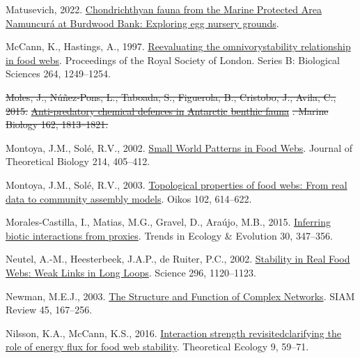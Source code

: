 \documentclass[
]{article}
\newlength{\cslhangindent}
\newenvironment{CSLReferences}[2] %
 {\begin{list}{}{%
  \setlength{\itemindent}{0pt}
  \setlength{\leftmargin}{0pt}
  \setlength{\parsep}{0pt}
  \ifodd #1
   \setlength{\leftmargin}{\cslhangindent}
   \setlength{\itemindent}{-1\cslhangindent}
  \fi
  \setlength{\itemsep}{#2\baselineskip}}}
 {\end{list}}
\providecommand{\DIFdel}[1]{{\protect\color{red}\sout{#1}}}                      %
\providecommand{\DIFdelbegin}{} %
\providecommand{\DIFdelend}{} %
\newcommand{\DIFscaledelfig}{0.5}
\newlength{\DIFdelgraphicswidth} %
\newlength{\DIFdelgraphicsheight} %
\newcommand{\DIFdelincludegraphics}[2][]{%
\sbox{\DIFdelgraphicsbox}{\DIFOincludegraphics[#1]{#2}}%
\settoboxwidth{\DIFdelgraphicswidth}{\DIFdelgraphicsbox} %
\settoboxtotalheight{\DIFdelgraphicsheight}{\DIFdelgraphicsbox} %
\scalebox{\DIFscaledelfig}{%
\parbox[b]{\DIFdelgraphicswidth}{\usebox{\DIFdelgraphicsbox}\\[-\baselineskip] \rule{\DIFdelgraphicswidth}{0em}}\llap{\resizebox{\DIFdelgraphicswidth}{\DIFdelgraphicsheight}{%
\setlength{\unitlength}{\DIFdelgraphicswidth}%
\begin{picture}(1,1)%
\thicklines\linethickness{2pt} %
{\color[rgb]{1,0,0}\put(0,0){\framebox(1,1){}}}%
{\color[rgb]{1,0,0}\put(0,0){\line( 1,1){1}}}%
{\color[rgb]{1,0,0}\put(0,1){\line(1,-1){1}}}%
\end{picture}%
}\hspace*{3pt}}} %
} %
\DeclareRobustCommand{\DIFdelbegin}{\DIFOdelbegin \let\includegraphics\DIFdelincludegraphics} %
\DeclareRobustCommand{\DIFdelend}{\DIFOaddend \let\includegraphics\DIFOincludegraphics} %
\begin{document}
\begin{CSLReferences}{1}{0}
Matusevich, 2022.
\href{https://doi.org/10.21203/rs.3.rs-2247873/v1}{Chondrichthyan fauna
from the {Marine Protected Area Namuncur{á}} at {Burdwood Bank}:
Exploring egg nursery grounds}.

McCann, K., Hastings, A., 1997.
\href{https://doi.org/10.1098/rspb.1997.0172}{Re{\textendash}evaluating
the omnivory{\textendash}stability relationship in food webs}.
Proceedings of the Royal Society of London. Series B: Biological
Sciences 264, 1249--1254.

\DIFdelbegin {}
\DIFdel{Moles, J., Núñez-Pons, L., Taboada, S., Figuerola, B., Cristobo, J.,
Avila, C., 2015.
}\href{https://doi.org/10.1007/s00227-015-2714-9}{\DIFdel{Anti-predatory chemical
defences in }%
\DIFdel{Antarctic}%
\DIFdel{benthic fauna}}%
\DIFdel{. Marine Biology 162, 1813--1821.
}%

\DIFdelend {}
Montoya, J.M., Solé, R.V., 2002.
\href{https://doi.org/10.1006/jtbi.2001.2460}{Small {World Patterns} in
{Food Webs}}. Journal of Theoretical Biology 214, 405--412.

Montoya, J.M., Solé, R.V., 2003.
\href{https://doi.org/10.1034/j.1600-0706.2003.12031.x}{Topological
properties of food webs: From real data to community assembly models}.
Oikos 102, 614--622.

Morales-Castilla, I., Matias, M.G., Gravel, D., Araújo, M.B., 2015.
\href{https://doi.org/10.1016/j.tree.2015.03.014}{Inferring biotic
interactions from proxies}. Trends in Ecology \& Evolution 30, 347--356.

Neutel, A.-M., Heesterbeek, J.A.P., de Ruiter, P.C., 2002.
\href{https://doi.org/10.1126/science.1068326}{Stability in {Real Food
Webs}: {Weak Links} in {Long Loops}}. Science 296, 1120--1123.

Newman, M.E.J., 2003.
\href{https://doi.org/10.1137/S003614450342480}{The {Structure} and
{Function} of {Complex Networks}}. SIAM Review 45, 167--256.

Nilsson, K.A., McCann, K.S., 2016.
\href{https://doi.org/10.1007/s12080-015-0282-8}{Interaction strength
revisited{\textemdash}clarifying the role of energy flux for food web
stability}. Theoretical Ecology 9, 59--71.


\end{CSLReferences}
\end{document}
